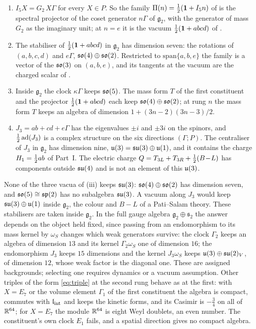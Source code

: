\begin{proposition}
\label{prop:vacua2}
\begin{enumerate}[label=(\roman*),leftmargin=2.2em,itemsep=1pt]
\item $I_5X=G_2\,X\Gamma$ for every $X\in P$. So the family $\Pi(n)=\tfrac12(\mathbf 1+I_5n)$ of  is the spectral projector of the coset
generator $n\Gamma$ of $\mathfrak g_2$, with the generator of mass $G_2$ as the imaginary unit; at $n=e$ it is the vacuum $\tfrac12(\mathbf 1+abcd)$
of .
\item The stabiliser of $\tfrac12(\mathbf 1+abcd)$ in $\mathfrak g_2$ has dimension seven: the rotations of $(a,b,c,d)$ and $e\Gamma$,
$\mathfrak{so}(4)\oplus\mathfrak{so}(2)$. Restricted to $\mathrm{span}\{a,b,e\}$ the family is a vector of the $\mathfrak{so}(3)$ on $(a,b,e)$, and its tangents at the vacuum
are the charged scalar of .
\item Inside $\mathfrak g_2$ the clock $\kappa\Gamma$ keeps $\mathfrak{so}(5)$. The mass form $T$ of the first constituent and the projector $\tfrac12(\mathbf 1+abcd)$ each keep
$\mathfrak{so}(4)\oplus\mathfrak{so}(2)$; at rung $n$ the mass form $T$ keeps an algebra of dimension $1+(3n-2)(3n-3)/2$.
\item $J_3=ab+cd+e\Gamma$ has the eigenvalues $\pm i$ and $\pm3i$ on the spinors, and $\tfrac12\,\mathrm{ad}(J_3)$ is a complex structure on the
six directions $(\Gamma;P)$. The centraliser of $J_3$ in $\mathfrak g_2$ has dimension nine, $\mathfrak{u}(3)=\mathfrak{su}(3)\oplus\mathfrak{u}(1)$, and it contains the
charge $H_1=\tfrac12 ab$ of Part~I. The electric charge $Q=T_{3L}+T_{3R}+\tfrac12(B\!-\!L)$ has components outside $\mathfrak{su}(4)$ and is not an element of
this $\mathfrak{u}(3)$.
\end{enumerate}
\end{proposition}

None of the three vacua of (iii) keeps $\mathfrak{su}(3)$: $\mathfrak{so}(4)\oplus\mathfrak{so}(2)$ has dimension seven, and $\mathfrak{so}(5)\cong\mathfrak{sp}(2)$ has no subalgebra $\mathfrak{su}(3)$. A vacuum
along $J_3$ would keep $\mathfrak{su}(3)\oplus\mathfrak{u}(1)$ inside $\mathfrak g_2$, the colour and $B\!-\!L$ of a Pati--Salam theory. These stabilisers are taken
inside $\mathfrak g_2$. In the full gauge algebra $\mathfrak g_2\oplus\mathfrak s_2$ the answer depends on the object held fixed, since passing
from an endomorphism to its mass kernel by $\omega_S$ changes which weak generators survive: the clock $\Gamma_2$ keeps an algebra of
dimension $13$ and its kernel $\Gamma_2\omega_S$ one of dimension $16$; the endomorphism $J_3$ keeps $15$ dimensions and the kernel $J_3\omega_S$
keeps $\mathfrak{u}(3)\oplus\mathfrak{su}(2)_V$, of dimension $12$, whose weak factor is the diagonal one. These are assigned backgrounds; selecting one requires
dynamics or a vacuum assumption.
 Other triples of the form \cref{eq:triple} at the
second rung behave as at the first: with $X=E_7$ or the volume element $\Gamma_1$ of the first constituent the algebra is compact, commutes
with $\mathfrak l_{\rm int}$ and keeps the kinetic forms, and its Casimir is $-\tfrac34$ on all of $\mathbb{R}^{64}$; for $X=E_7$ the module $\mathbb{R}^{64}$ is eight Weyl
doublets, an even number. The constituent's own clock $E_1$ fails, and a spatial direction gives no compact algebra.

